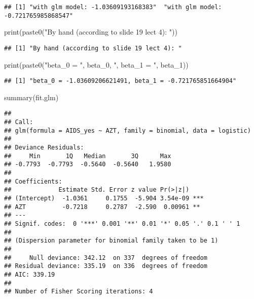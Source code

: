 \documentclass[
]{article}
\newenvironment{Shaded}{\begin{snugshade}}{\end{snugshade}}
\newcommand{\FunctionTok}[1]{\textcolor[rgb]{0.00,0.00,0.00}{#1}}
\newcommand{\NormalTok}[1]{#1}
\newcommand{\StringTok}[1]{\textcolor[rgb]{0.31,0.60,0.02}{#1}}
\begin{document}
\begin{verbatim}
## [1] "with glm model: -1.03609193168383"  "with glm model: -0.721765985868547"
\end{verbatim}

\begin{Shaded}
\begin{Highlighting}[]
\FunctionTok{print}\NormalTok{(}\FunctionTok{paste0}\NormalTok{(}\StringTok{"By hand (according to slide 19 lect 4): "}\NormalTok{))}
\end{Highlighting}
\end{Shaded}

\begin{verbatim}
## [1] "By hand (according to slide 19 lect 4): "
\end{verbatim}

\begin{Shaded}
\begin{Highlighting}[]
\FunctionTok{print}\NormalTok{(}\FunctionTok{paste0}\NormalTok{(}\StringTok{"beta\_0 = "}\NormalTok{, beta\_0, }\StringTok{", beta\_1 = "}\NormalTok{, beta\_1))}
\end{Highlighting}
\end{Shaded}

\begin{verbatim}
## [1] "beta_0 = -1.03609206621491, beta_1 = -0.721765851664904"
\end{verbatim}

\begin{Shaded}
\begin{Highlighting}[]
\FunctionTok{summary}\NormalTok{(fit.glm)}
\end{Highlighting}
\end{Shaded}

\begin{verbatim}
## 
## Call:
## glm(formula = AIDS_yes ~ AZT, family = binomial, data = logistic)
## 
## Deviance Residuals: 
##     Min       1Q   Median       3Q      Max  
## -0.7793  -0.7793  -0.5640  -0.5640   1.9580  
## 
## Coefficients:
##             Estimate Std. Error z value Pr(>|z|)    
## (Intercept)  -1.0361     0.1755  -5.904 3.54e-09 ***
## AZT          -0.7218     0.2787  -2.590  0.00961 ** 
## ---
## Signif. codes:  0 '***' 0.001 '**' 0.01 '*' 0.05 '.' 0.1 ' ' 1
## 
## (Dispersion parameter for binomial family taken to be 1)
## 
##     Null deviance: 342.12  on 337  degrees of freedom
## Residual deviance: 335.19  on 336  degrees of freedom
## AIC: 339.19
## 
## Number of Fisher Scoring iterations: 4
\end{verbatim}
\end{document}
